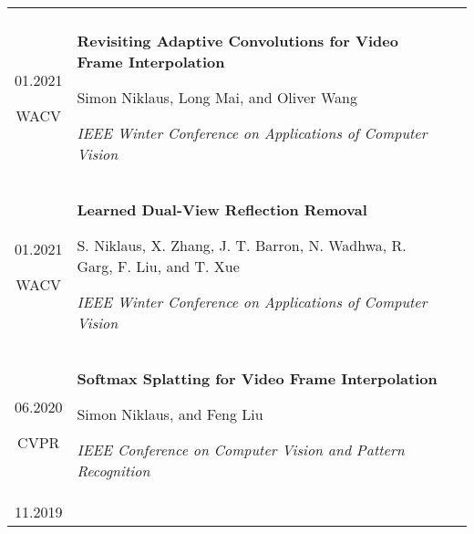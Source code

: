 \documentclass[10pt]{article}
\begin{document}
\begin{tabular}{C Z D}
{		\vspace{0.0cm}
	}
	\\
	{
		01.2021
		
		\vspace{-0.05cm}
		
		{\scriptsize WACV}
	}
	&
	{
		{\bf Revisiting Adaptive Convolutions for Video Frame Interpolation}
		
		\vspace{0.00cm}
		
		{\scriptsize Simon Niklaus, Long Mai, and Oliver Wang}
		
		\vspace{0.05cm}
		
		{\scriptsize \it IEEE Winter Conference on Applications of Computer Vision}
		
		\vspace{0.0cm}
	}
	\\
	{
		01.2021
		
		\vspace{-0.05cm}
		
		{\scriptsize WACV}
	}
	&
	{
		{\bf Learned Dual-View Reflection Removal}
		
		\vspace{0.00cm}
		
		{\scriptsize S. Niklaus, X. Zhang, J. T. Barron, N. Wadhwa, R. Garg, F. Liu, and T. Xue}
		
		\vspace{0.05cm}
		
		{\scriptsize \it IEEE Winter Conference on Applications of Computer Vision}
		
		\vspace{0.0cm}
	}
	\\
	{
		06.2020
		
		\vspace{-0.05cm}
		
		{\scriptsize CVPR}
	}
	&
	{
		{\bf Softmax Splatting for Video Frame Interpolation}
		
		\vspace{0.00cm}
		
		{\scriptsize Simon Niklaus, and Feng Liu}
		
		\vspace{0.05cm}
		
		{\scriptsize \it IEEE Conference on Computer Vision and Pattern Recognition}
		
		\vspace{0.0cm}
	}
	\\
	{
		11.2019
		
}
\end{tabular}
\end{document}
